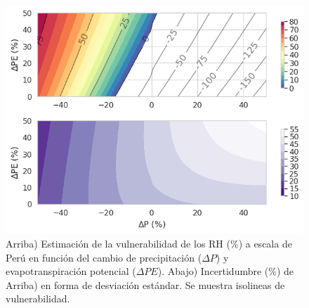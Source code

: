 \begin{figure}[ht!]
	\includegraphics[scale=.95]{Images/12_VI_PERU_scale.png}
	\centering
	\caption{Arriba) Estimación de la vulnerabilidad de los RH (\%) a escala de Perú en función del cambio de precipitación ($\Delta P$) y evapotranspiración potencial ($\Delta PE$). Abajo) Incertidumbre (\%) de Arriba) en forma de desviación estándar. Se muestra isolineas de vulnerabilidad.}
	\label{fig:12_VI_PERU_scale}
\end{figure}

